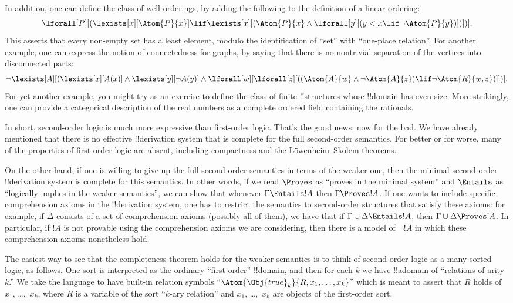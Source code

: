 \documentclass[../../../include/open-logic-section]{subfiles}
\begin{document}
In addition, one can define the class of well-orderings, by adding the
following to the definition of a linear ordering:
\[
\lforall[P][(\lexists[x][\Atom{P}{x}] \lif \lexists[x][(\Atom{P}{x}
    \land \lforall[y][(y < x \lif \lnot \Atom{P}{y})])])].
\]
This asserts that every non-empty set has a least element, modulo the
identification of ``set'' with ``one-place relation''. For another
example, one can express the notion of connectedness for graphs, by
saying that there is no nontrivial separation of the vertices into
disconnected parts:
\[
\lnot \lexists[A][(\lexists[x][A(x)] \land \lexists[y][\lnot A(y)]
  \land \lforall[w][\lforall[z][((\Atom{A}{w} \land \lnot \Atom{A}{z})
      \lif \lnot \Atom{R}{w,z})]])].
\]
For yet another example, you might try as an exercise to define the
class of finite !!{structure}s whose !!{domain} has even size. More
strikingly, one can provide a categorical description of the real
numbers as a complete ordered field containing the rationals.

In short, second-order logic is much more expressive than first-order
logic. That's the good news; now for the bad. We have already
mentioned that there is no effective !!{derivation} system that is complete for
the full second-order semantics. For better or for worse, many of the
properties of first-order logic are absent, including compactness and
the L\"owenheim--Skolem theorems.

On the other hand, if one is willing to give up the full second-order
semantics in terms of the weaker one, then the minimal second-order
!!{derivation} system is complete for this semantics. In other words, if we
read $\Proves$ as ``proves in the minimal system'' and $\Entails$ as
``logically implies in the weaker semantics'', we can show that
whenever $\Gamma \Entails !A$ then $\Gamma \Proves !A$. If one wants
to include specific comprehension axioms in the !!{derivation} system, one has
to restrict the semantics to second-order structures that satisfy
these axioms: for example, if $\Delta$ consists of a set of
comprehension axioms (possibly all of them), we have that if $\Gamma
\cup \Delta \Entails !A$, then $\Gamma \cup \Delta \Proves !A$. In
particular, if $!A$ is not provable using the comprehension axioms we
are considering, then there is a model of $\lnot !A$ in which these
comprehension axioms nonetheless hold.

The easiest way to see that the completeness theorem holds for the
weaker semantics is to think of second-order logic as a many-sorted
logic, as follows. One sort is interpreted as the ordinary
``first-order'' !!{domain}, and then for each $k$ we have !!a{domain}
of ``relations of arity $k$.'' We take the language to have built-in
relation symbols ``$\Atom{\Obj{true}_k}{R,x_1,\dots,x_k}$'' which is
meant to assert that $R$ holds of $x_1$, \dots,~$x_k$, where $R$ is a
variable of the sort ``$k$-ary relation'' and $x_1$, \dots,~$x_k$ are
objects of the first-order sort.
\end{document}

